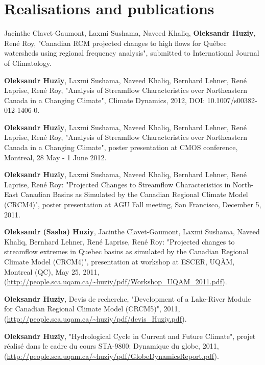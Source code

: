 \documentclass[letterpaper]{article}
\renewenvironment{itemize}{
  \begin{list}{}{
    \setlength{\leftmargin}{0em}
  }
}{
  \end{list}
}
\begin{document}
\section*{Realisations and publications}


\begin{itemize}
    \item Jacinthe Clavet-Gaumont, Laxmi Sushama, Naveed Khaliq,
    \textbf{Oleksandr Huziy}, René Roy, "Canadian RCM projected changes to high
    flows for Québec watersheds using regional frequency analysis", submitted to International Journal of Climatology.
    
    \item \textbf{Oleksandr Huziy}, Laxmi Sushama, Naveed Khaliq, Bernhard
    Lehner, René Laprise, René Roy, "Analysis of Streamflow Characteristics over Northeastern Canada 
     in a Changing Climate", Climate Dynamics, 2012, DOI:
     10.1007/s00382-012-1406-0.
    \item \textbf{Oleksandr Huziy}, Laxmi Sushama, Naveed Khaliq, Bernhard Lehner,
     René Laprise, René Roy, "Analysis of Streamflow Characteristics over Northeastern Canada 
     in a Changing Climate", poster presentation at CMOS conference, Montreal,
     28 May - 1 June 2012.
    \item \textbf{Oleksandr Huziy}, Laxmi Sushama, Naveed Khaliq, Bernhard Lehner, René
    Laprise, René Roy: "Projected Changes to Streamflow Characteristics in
    North-East Canadian Basins as Simulated by the Canadian Regional Climate
    Model (CRCM4)", poster presentation at AGU Fall meeting, San Francisco,
    December 5, 2011.
    \item \textbf{Oleksandr (Sasha) Huziy}, Jacinthe Clavet-Gaumont, Laxmi
    Sushama, Naveed Khaliq, Bernhard Lehner, René Laprise, René Roy: "Projected changes to streamflow extremes in Quebec
    basins as simulated by the Canadian Regional Climate Model (CRCM4)",
    presentation at workshop at ESCER, UQÀM, Montreal (QC), May 25, 2011,
    (\url{http://people.sca.uqam.ca/~huziy/pdf/Workshop_UQAM_2011.pdf}).
   
    \item \textbf{Oleksandr Huziy}, Devis de recherche, "Development of a
    Lake-River Module for Canadian Regional Climate Model (CRCM5)", 2011,
    (\url{http://people.sca.uqam.ca/~huziy/pdf/devis_Huziy.pdf}).
   
    \item \textbf{Oleksandr Huziy}, "Hydrological Cycle in Current and Future Climate",
    projet réalisé dans le cadre du cours STA-9800: Dynamique du globe, 2011,\\
     (\url{http://people.sca.uqam.ca/~huziy/pdf/GlobeDynamicsReport.pdf}).
   

\end{itemize}
\end{document}

